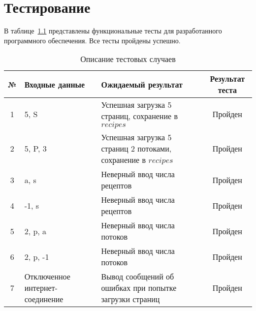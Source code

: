 \chapter{Тестирование}

В таблице~\ref{tbl:tests} представлены функциональные тесты для разработанного
программного обеспечения. Все тесты пройдены успешно.

\begin{table}[h!]
    \begin{center}
		\begin{threeparttable}
    \caption{Описание тестовых случаев}
    \captionsetup{justification=raggedright, singlelinecheck=false}
    \label{tbl:tests}
    \begin{tabular}{|c|p{5cm}|p{7cm}|c|}
        \hline
        \textbf{№} & \textbf{Входные данные} & \textbf{Ожидаемый результат} & \textbf{Результат теста} \\
        \hline
        1 & 5, S & Успешная загрузка 5 страниц, сохранение в $recipes$ & Пройден \\
        \hline
        2 & 5, P, 3 & Успешная загрузка 5 страниц 2 потоками, сохранение в $recipes$ & Пройден \\
        \hline
        3 & a, s & Неверный ввод числа рецептов & Пройден \\
        \hline
        4 & -1, s & Неверный ввод числа рецептов & Пройден \\
        \hline
        5 & 2, p, a & Неверный ввод числа потоков & Пройден \\
        \hline
        6 & 2, p, -1 & Неверный ввод числа потоков & Пройден \\
        \hline
        7 & Отключенное интернет-соединение & Вывод сообщений об ошибках при попытке загрузки страниц & Пройден \\
        \hline
    \end{tabular}
    \end{threeparttable}
    \end{center}
\end{table}

\clearpage